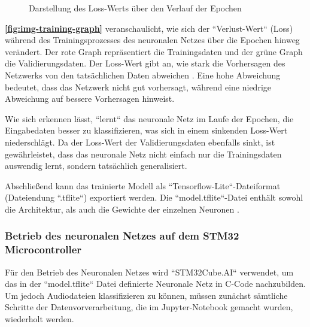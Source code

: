\begin{figure} %
	\vspace{-20pt + 0.02\textwidth}
	\caption{Darstellung des Loss-Werts über den Verlauf der Epochen}
	\label{fig:img-training-graph}
\end{figure}

\textbf{\autoref{fig:img-training-graph}} veranschaulicht, wie sich der ``Verlust-Wert`` (Loss) während des Trainingsprozesses des neuronalen Netzes über die Epochen hinweg verändert. Der rote Graph repräsentiert die Trainingsdaten und der grüne Graph die Validierungsdaten. Der Loss-Wert gibt an, wie stark die Vorhersagen des Netzwerks von den tatsächlichen Daten abweichen \cite{neural-network-basics}. Eine hohe Abweichung bedeutet, dass das Netzwerk nicht gut vorhersagt, während eine niedrige Abweichung auf bessere Vorhersagen hinweist.

Wie sich erkennen lässt, ``lernt`` das neuronale Netz im Laufe der Epochen, die Eingabedaten besser zu klassifizieren, was sich in einem sinkenden Loss-Wert niederschlägt. Da der Loss-Wert der Validierungsdaten ebenfalls sinkt, ist gewährleistet, dass das neuronale Netz nicht einfach nur die Trainingsdaten auswendig lernt, sondern tatsächlich generalisiert.

Abschließend kann das trainierte Modell als ``Tensorflow-Lite``-Dateiformat (Dateiendung ``.tflite``) exportiert werden. Die ``model.tflite``-Datei enthält sowohl die Architektur, als auch die Gewichte der einzelnen Neuronen \cite{tflite-file}.

\subsubsection{Betrieb des neuronalen Netzes auf dem STM32 Microcontroller}
\label{stm32-cube-ai}

Für den Betrieb des Neuronalen Netzes wird ``STM32Cube.AI`` verwendet, um das in der ``model.tflite`` Datei definierte Neuronale Netz in C-Code nachzubilden. Um jedoch Audiodateien klassifizieren zu können, müssen zunächst sämtliche Schritte der Datenvorverarbeitung, die im Jupyter-Notebook gemacht wurden, wiederholt werden.

